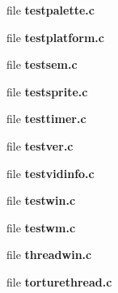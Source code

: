 \begin{DoxyCompactItemize}
\item 
file {\bfseries testpalette.\+c}
\item 
file {\bfseries testplatform.\+c}
\item 
file {\bfseries testsem.\+c}
\item 
file {\bfseries testsprite.\+c}
\item 
file {\bfseries testtimer.\+c}
\item 
file {\bfseries testver.\+c}
\item 
file {\bfseries testvidinfo.\+c}
\item 
file {\bfseries testwin.\+c}
\item 
file {\bfseries testwm.\+c}
\item 
file {\bfseries threadwin.\+c}
\item 
file {\bfseries torturethread.\+c}
\end{DoxyCompactItemize}
